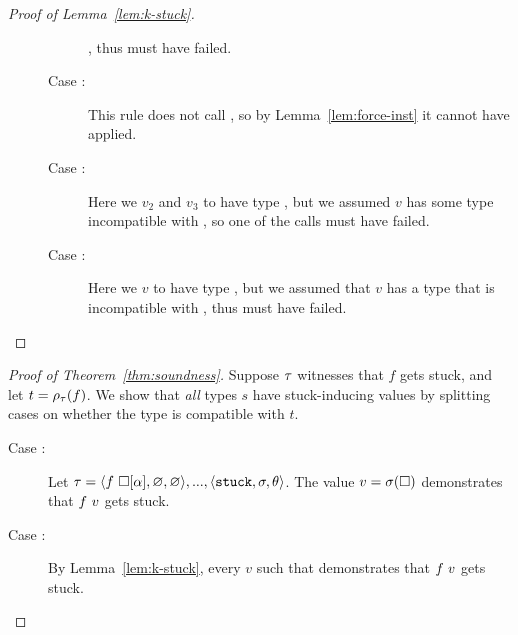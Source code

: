 \begin{proof}[Proof of Lemma~\ref{lem:k-stuck}]
\begin{description}
\begin{description}
      \tfun, thus \forcesym must have failed.
    \item[Case \releafgood:] This rule does not call \forcesym, so by
      Lemma~\ref{lem:force-inst} it cannot have applied.
    \item[Case \renodegood:] Here we \forcesym $v_2$ and $v_3$ to have
      type \ttree{\thole}, but we assumed $v$ has some type incompatible
      with \ttree{\thole}, so one of the \forcesym calls must have
      failed.
    \item[Case \rulename{E-Case-Good\{1,2\}}:] Here we \forcesym $v$ to
      have type \ttree{\thole}, but we assumed that $v$ has a type that
      is incompatible with \ttree{\thole}, thus \forcesym must have
      failed.
    \end{description}
  \end{description}
\end{proof}

\begin{proof}[Proof of Theorem~\ref{thm:soundness}]
Suppose $\tau$ witnesses that $f$ gets stuck,
and let $t = \rho_{\tau}(f)$.
We show that \emph{all} types $s$ have stuck-inducing
values by splitting cases on whether the type is
compatible with $t$. %
%
\begin{description}
\item [Case :]
  Let $\tau = \langle f\ \square[\alpha], \varnothing, \varnothing \rangle,...,\langle \mathtt{stuck}, \sigma, \theta \rangle$.
  The value $v = \sigma(\square)$ demonstrates that
  $f\ v$ gets stuck.
\item [Case :] By Lemma~\ref{lem:k-stuck}, every $v$
  such that  demonstrates that $f\ v$ gets stuck.
\end{description}
\end{proof}
